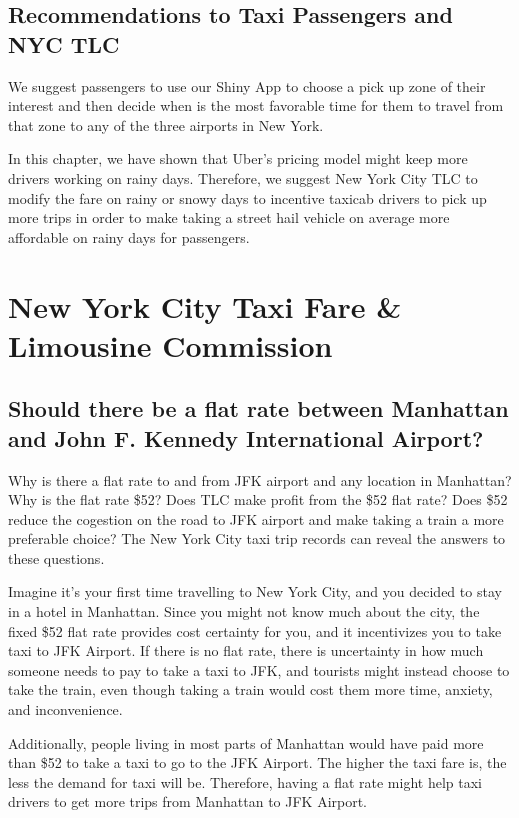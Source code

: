 \documentclass[12pt,twoside]{reedthesis}
\theoremstyle{definition}
\theoremstyle{definition}
\theoremstyle{definition}
\theoremstyle{remark}
\begin{document}
\section{Recommendations to Taxi Passengers and NYC
TLC}\label{recommendations-to-taxi-passengers-and-nyc-tlc}

We suggest passengers to use our Shiny App to choose a pick up zone of
their interest and then decide when is the most favorable time for them
to travel from that zone to any of the three airports in New York.

In this chapter, we have shown that Uber's pricing model might keep more
drivers working on rainy days. Therefore, we suggest New York City TLC
to modify the fare on rainy or snowy days to incentive taxicab drivers
to pick up more trips in order to make taking a street hail vehicle on
average more affordable on rainy days for passengers.

\chapter{New York City Taxi Fare \& Limousine
Commission}\label{chapter5}

\section{Should there be a flat rate between Manhattan and John F.
Kennedy International
Airport?}\label{should-there-be-a-flat-rate-between-manhattan-and-john-f.-kennedy-international-airport}

Why is there a flat rate to and from JFK airport and any location in
Manhattan? Why is the flat rate \$52? Does TLC make profit from the \$52
flat rate? Does \$52 reduce the cogestion on the road to JFK airport and
make taking a train a more preferable choice? The New York City taxi
trip records can reveal the answers to these questions.

Imagine it's your first time travelling to New York City, and you
decided to stay in a hotel in Manhattan. Since you might not know much
about the city, the fixed \$52 flat rate provides cost certainty for
you, and it incentivizes you to take taxi to JFK Airport. If there is no
flat rate, there is uncertainty in how much someone needs to pay to take
a taxi to JFK, and tourists might instead choose to take the train, even
though taking a train would cost them more time, anxiety, and
inconvenience.

Additionally, people living in most parts of Manhattan would have paid
more than \$52 to take a taxi to go to the JFK Airport. The higher the
taxi fare is, the less the demand for taxi will be. Therefore, having a
flat rate might help taxi drivers to get more trips from Manhattan to
JFK Airport.
\end{document}
